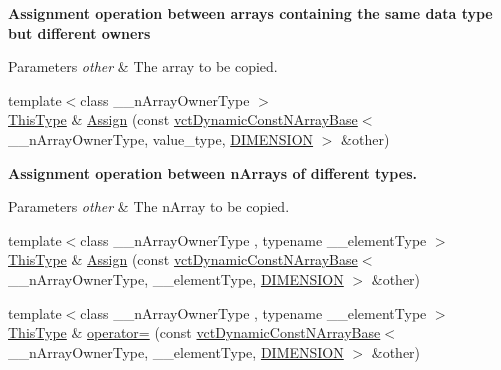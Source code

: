 \begin{Indent}{\bf Assignment operation between arrays containing the same data type but different owners}\par
{\em 
\begin{DoxyParams}{Parameters}
{\em other} & The array to be copied. \\
\hline
\end{DoxyParams}
}\begin{DoxyCompactItemize}
\item 
{\footnotesize template$<$class \-\_\-\-\_\-n\-Array\-Owner\-Type $>$ }\\\hyperlink{classvct_dynamic_const_n_array_base_a5123caffcf1455a1b99003877eade897}{This\-Type} \& \hyperlink{classvct_dynamic_n_array_base_ab9c91c7f9a6c59ba68d3467c26853215}{Assign} (const \hyperlink{classvct_dynamic_const_n_array_base}{vct\-Dynamic\-Const\-N\-Array\-Base}$<$ \-\_\-\-\_\-n\-Array\-Owner\-Type, value\-\_\-type, \hyperlink{classvct_dynamic_n_array_base_aa66532d28588bdf26d08fb593db815d6abfcde386ec801b212d7c42d63a4f3837}{D\-I\-M\-E\-N\-S\-I\-O\-N} $>$ \&other)
\end{DoxyCompactItemize}
\end{Indent}
\begin{Indent}{\bf Assignment operation between n\-Arrays of different types.}\par
{\em 
\begin{DoxyParams}{Parameters}
{\em other} & The n\-Array to be copied. \\
\hline
\end{DoxyParams}
}\begin{DoxyCompactItemize}
\item 
{\footnotesize template$<$class \-\_\-\-\_\-n\-Array\-Owner\-Type , typename \-\_\-\-\_\-element\-Type $>$ }\\\hyperlink{classvct_dynamic_const_n_array_base_a5123caffcf1455a1b99003877eade897}{This\-Type} \& \hyperlink{classvct_dynamic_n_array_base_ae889062e3f1bd8a5cb756b1ffdddfc95}{Assign} (const \hyperlink{classvct_dynamic_const_n_array_base}{vct\-Dynamic\-Const\-N\-Array\-Base}$<$ \-\_\-\-\_\-n\-Array\-Owner\-Type, \-\_\-\-\_\-element\-Type, \hyperlink{classvct_dynamic_n_array_base_aa66532d28588bdf26d08fb593db815d6abfcde386ec801b212d7c42d63a4f3837}{D\-I\-M\-E\-N\-S\-I\-O\-N} $>$ \&other)
\item 
{\footnotesize template$<$class \-\_\-\-\_\-n\-Array\-Owner\-Type , typename \-\_\-\-\_\-element\-Type $>$ }\\\hyperlink{classvct_dynamic_const_n_array_base_a5123caffcf1455a1b99003877eade897}{This\-Type} \& \hyperlink{classvct_dynamic_n_array_base_a864deed65fd52a66cbe69baa302d1f2d}{operator=} (const \hyperlink{classvct_dynamic_const_n_array_base}{vct\-Dynamic\-Const\-N\-Array\-Base}$<$ \-\_\-\-\_\-n\-Array\-Owner\-Type, \-\_\-\-\_\-element\-Type, \hyperlink{classvct_dynamic_n_array_base_aa66532d28588bdf26d08fb593db815d6abfcde386ec801b212d7c42d63a4f3837}{D\-I\-M\-E\-N\-S\-I\-O\-N} $>$ \&other)
\end{DoxyCompactItemize}
\end{Indent}
